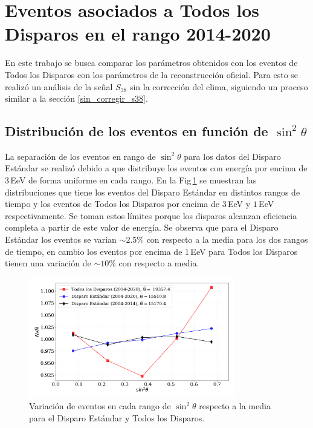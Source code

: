 
\section{Eventos asociados a Todos los Disparos en el rango 2014-2020 }	\label{ALL_modulacion}
	

En este trabajo se busca comparar los parámetros obtenidos con los eventos de Todos los Disparos con los parámetros de la reconstrucción oficial. Para esto se realizó un análisis de la señal $S_{38}$ sin la corrección del clima, siguiendo un proceso similar a la sección \ref{sin_corregir_s38}.


\subsection{Distribución de los eventos en función de $\sin^2\theta$}

La separación de los eventos en rango de $\sin^2\theta$ para los datos del Disparo Estándar se realizó debido a que distribuye los eventos con energía por encima de $3\,$EeV de forma uniforme en cada rango. En la Fig\,\ref{fig:bin_eventos_sin_2_theta} se muestran las distribuciones que tiene los eventos del Disparo Estándar en distintos rangos de tiempo y los eventos de Todos los Disparos por encima de $3\,$EeV y $1\,$EeV respectivamente. Se toman estos límites porque los disparos alcanzan eficiencia completa a partir de este valor de energía.  Se observa que para el Disparo Estándar los eventos se varian $\sim 2.5\%$ con respecto a la media para los dos rangos de tiempo, en cambio los eventos por encima de $1\,$EeV para Todos los Disparos tienen una variación de $\sim 10\%$ con respecto a media.

\begin{figure}[H]
  \begin{small}
    \begin{center}
      \includegraphics[width=0.8\textwidth]{bin_eventos_sin_2_theta.pdf}
    \end{center}
    \caption{Variación de eventos en cada rango de $\sin^2\theta$ respecto a la media para el Disparo Estándar y Todos los Disparos. }
    \label{fig:bin_eventos_sin_2_theta}
  \end{small}
\end{figure}
